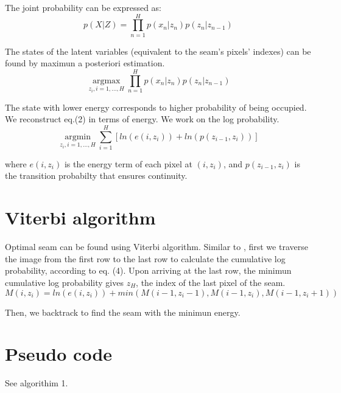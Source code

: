 \documentclass{article}
\begin{document}
    The joint probability can be expressed as:
    \begin{equation}
    	p(X|Z) = \prod_{n=1}^{H}p(x_{n}|z_{n})p(z_{n}|z_{n-1})
    \end{equation}

    The states of the latent variables (equivalent to the seam's pixels' indexes) can be found by maximun a posteriori estimation.
    \begin{equation}
    	\underset{z_{i}, i=1, \ldots, H}{\operatorname{argmax}} \prod_{n=1}^{H}p(x_{n}|z_{n})p(z_{n}|z_{n-1})
    \end{equation}

    The state with lower energy corresponds to higher probability of being occupied. We reconstruct eq.(2) in terms of energy. We work on the log probability.
    \begin{equation}
    	\underset{z_{i}, i=1, \ldots, H}{\operatorname{argmin}} \sum_{i=1}^{H} [ln(e(i,z_{i})) + ln(p(z_{i-1},z_{i}))]
    \end{equation}

    where $e(i,z_{i})$ is the energy term of each pixel at $(i,z_{i})$, and $p(z_{i-1},z_{i})$ is the transition probabilty that ensures continuity.

\section*{Viterbi algorithm}
	Optimal seam can be found using Viterbi algorithm. Similar to \cite{SeamCarving}, first we traverse the image from the first row to the last row to calculate the cumulative log probability, according to eq. (4). Upon arriving at the last row, the minimun cumulative log probability gives $z_{H}$, the index of the last pixel of the seam.
	\begin{equation}
    	M(i,z_{i}) = ln(e(i,z_{i})) + min(M(i-1,z_{i}-1), M(i-1,z_{i}), M(i-1,z_{i}+1))
    \end{equation}

    Then, we backtrack to find the seam with the minimun energy.

\section*{Pseudo code}
	See algorithim 1.
\end{document}
